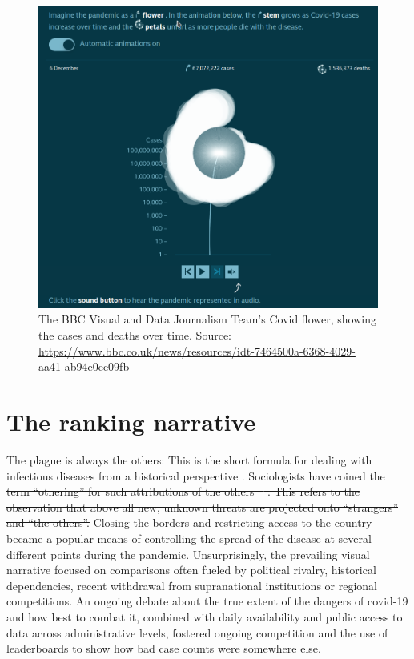 \documentclass[article]{jdssv}\usepackage[]{graphicx}\usepackage[]{xcolor} %
\providecommand{\DIFdel}[1]{{\protect\color{red}\sout{#1}}}                      %
\providecommand{\DIFdelbegin}{} %
\providecommand{\DIFdelend}{} %
\newcommand{\DIFscaledelfig}{0.5}
\newlength{\DIFdelgraphicswidth} %
\newlength{\DIFdelgraphicsheight} %
\newcommand{\DIFdelincludegraphics}[2][]{%
\sbox{\DIFdelgraphicsbox}{\DIFOincludegraphics[#1]{#2}}%
\settoboxwidth{\DIFdelgraphicswidth}{\DIFdelgraphicsbox} %
\settoboxtotalheight{\DIFdelgraphicsheight}{\DIFdelgraphicsbox} %
\scalebox{\DIFscaledelfig}{%
\parbox[b]{\DIFdelgraphicswidth}{\usebox{\DIFdelgraphicsbox}\\[-\baselineskip] \rule{\DIFdelgraphicswidth}{0em}}\llap{\resizebox{\DIFdelgraphicswidth}{\DIFdelgraphicsheight}{%
\setlength{\unitlength}{\DIFdelgraphicswidth}%
\begin{picture}(1,1)%
\thicklines\linethickness{2pt} %
{\color[rgb]{1,0,0}\put(0,0){\framebox(1,1){}}}%
{\color[rgb]{1,0,0}\put(0,0){\line( 1,1){1}}}%
{\color[rgb]{1,0,0}\put(0,1){\line(1,-1){1}}}%
\end{picture}%
}\hspace*{3pt}}} %
} %
\DeclareRobustCommand{\DIFdelbegin}{\DIFOdelbegin \let\includegraphics\DIFdelincludegraphics} %
\DeclareRobustCommand{\DIFdelend}{\DIFOaddend \let\includegraphics\DIFOincludegraphics} %
\begin{document}
\begin{figure}
\centering
\includegraphics[width=.8\linewidth]{Figures_Web/BBC_flower_time_series}
\caption{The BBC Visual and Data Journalism Team's Covid flower, showing the cases and deaths over time. Source: \url{https://www.bbc.co.uk/news/resources/idt-7464500a-6368-4029-aa41-ab94e0ee09fb}}\label{fig:bbc-flower}
\end{figure}


\section{The ranking narrative}
\label{sec:rankings}

The plague is always the others: This is the short formula for dealing with infectious diseases from a historical perspective \citep{thiessen2021}. \DIFdelbegin \DIFdel{Sociologists have coined the term ``othering'' for such attributions of the others \mbox{%
\citep{mountz2009}}\hskip0pt%
. This refers to the observation that above all new, unknown threats are projected onto ``strangers'' and ``the others''. }\DIFdelend Closing the borders and restricting access to the country became a popular means of controlling the spread of the disease at several different points during the pandemic. Unsurprisingly, the prevailing visual narrative focused on comparisons often fueled by political rivalry, historical dependencies, recent withdrawal from supranational institutions or regional competitions. An ongoing debate about the true extent of the dangers of covid-19 and how best to combat it, combined with daily availability and public access to data across administrative levels, fostered ongoing competition and the use of leaderboards to show how bad case counts were somewhere else. 
\end{document}
